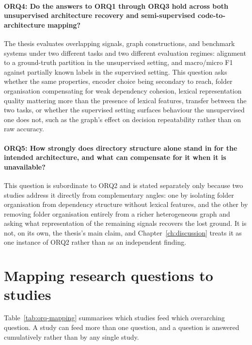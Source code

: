 \paragraph{ORQ4: Do the answers to ORQ1 through ORQ3 hold across both unsupervised architecture recovery and semi-supervised code-to-architecture mapping?}
The thesis evaluates overlapping signals, graph constructions, and benchmark systems under two different tasks and two different evaluation regimes: alignment to a ground-truth partition in the unsupervised setting, and macro/micro F1 against partially known labels in the supervised setting. This question asks whether the same properties, encoder choice being secondary to reach, folder organisation compensating for weak dependency cohesion, lexical representation quality mattering more than the presence of lexical features, transfer between the two tasks, or whether the supervised setting surfaces behaviour the unsupervised one does not, such as the graph's effect on decision repeatability rather than on raw accuracy.

\paragraph{ORQ5: How strongly does directory structure alone stand in for the intended architecture, and what can compensate for it when it is unavailable?}
This question is subordinate to ORQ2 and is stated separately only because two studies address it directly from complementary angles: one by isolating folder organisation from dependency structure without lexical features, and the other by removing folder organisation entirely from a richer heterogeneous graph and asking what representation of the remaining signals recovers the lost ground. It is not, on its own, the thesis's main claim, and Chapter~\ref{ch:discussion} treats it as one instance of ORQ2 rather than as an independent finding.

\section{Mapping research questions to studies}
\label{sec:orq-mapping}

Table~\ref{tab:orq-mapping} summarises which studies feed which overarching question. A study can feed more than one question, and a question is answered cumulatively rather than by any single study.


